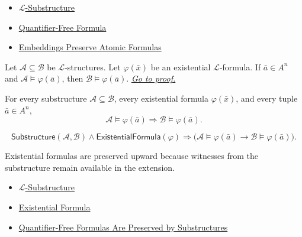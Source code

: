 \begin{dependencies}
\begin{itemize}
  \item \hyperref[def:l-substructure]{$\mathcal{L}$-Substructure}
  \item \hyperref[def:quantifier-free-formula]{Quantifier-Free Formula}
  \item \hyperref[lem:embeddings-preserve-atomic-formulas]{Embeddings Preserve Atomic Formulas}
\end{itemize}
\end{dependencies}

\begin{proposition}\label{prop:existential-formulas-preserved-in-extensions}
Let $\mathcal{A}\subseteq\mathcal{B}$ be $\mathcal{L}$-structures. Let
$\varphi(\bar x)$ be an existential $\mathcal{L}$-formula. If
$\bar a\in A^n$ and $\mathcal{A}\models\varphi(\bar a)$, then
$\mathcal{B}\models\varphi(\bar a)$.
\hyperref[prf:existential-formulas-preserved-in-extensions]{\textit{Go to proof.}}
\end{proposition}

\begin{remark*}
For every substructure $\mathcal{A}\subseteq\mathcal{B}$, every existential
formula $\varphi(\bar x)$, and every tuple $\bar a\in A^n$,
\[
  \mathcal{A}\models\varphi(\bar a)
  \Longrightarrow
  \mathcal{B}\models\varphi(\bar a).
\]
\end{remark*}

\begin{remark*}
\[
\mathsf{Substructure}(\mathcal{A},\mathcal{B})
\land
\mathsf{ExistentialFormula}(\varphi)
\Longrightarrow
\bigl(\mathcal{A}\models\varphi(\bar a)
\to
\mathcal{B}\models\varphi(\bar a)\bigr).
\]
\end{remark*}

\begin{remark*}[Interpretation]
Existential formulas are preserved upward because witnesses from the
substructure remain available in the extension.
\end{remark*}

\begin{dependencies}
\begin{itemize}
  \item \hyperref[def:l-substructure]{$\mathcal{L}$-Substructure}
  \item \hyperref[def:existential-formula]{Existential Formula}
  \item \hyperref[lem:quantifier-free-formulas-preserved-by-substructures]{Quantifier-Free Formulas Are Preserved by Substructures}
\end{itemize}
\end{dependencies}


